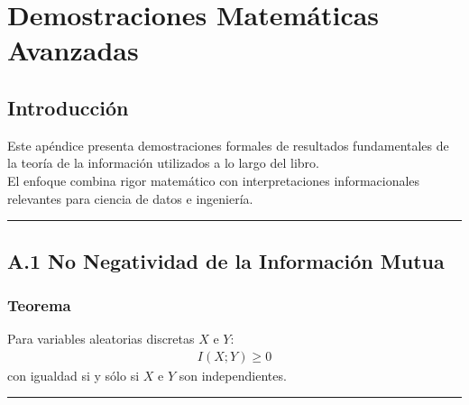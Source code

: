 \documentclass[letterpaper,10pt,english]{jupyterBook}
\begin{document}
\sphinxstepscope


\chapter{Demostraciones Matemáticas Avanzadas}
\label{\detokenize{05_appendices/proofs:demostraciones-matematicas-avanzadas}}\label{\detokenize{05_appendices/proofs::doc}}

\section{Introducción}
\label{\detokenize{05_appendices/proofs:introduccion}}
\sphinxAtStartPar
Este apéndice presenta demostraciones formales de resultados fundamentales de la teoría de la información utilizados a lo largo del libro.\\
El enfoque combina rigor matemático con interpretaciones informacionales relevantes para ciencia de datos e ingeniería.


\bigskip\hrule\bigskip



\section{A.1 No Negatividad de la Información Mutua}
\label{\detokenize{05_appendices/proofs:a-1-no-negatividad-de-la-informacion-mutua}}

\subsection{Teorema}
\label{\detokenize{05_appendices/proofs:teorema}}
\sphinxAtStartPar
Para variables aleatorias discretas \(X\) e \(Y\):
\begin{equation*}
\begin{split}
I(X;Y) \ge 0
\end{split}
\end{equation*}
\sphinxAtStartPar
con igualdad si y sólo si \(X\) e \(Y\) son independientes.


\bigskip\hrule\bigskip
\end{document}
